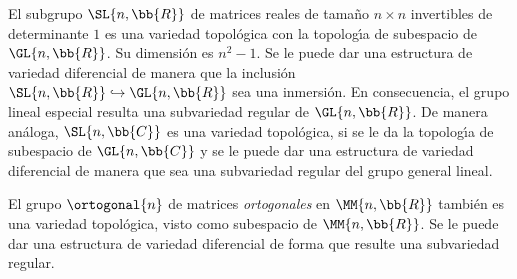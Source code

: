 \begin{ejemplo}
	El subgrupo $\SL{n,\bb{R}}$ de matrices reales de tama\~{n}o
	$n\times n$ invertibles de determinante $1$ es una variedad
	topol\'{o}gica con la topolog\'{\i}a de subespacio de
	$\GL{n,\bb{R}}$. Su dimensi\'{o}n es $n^{2}-1$. Se le puede
	dar una estructura de variedad diferencial de manera que
	la inclusi\'{o}n $\SL{n,\bb{R}}\hookrightarrow\GL{n,\bb{R}}$
	sea una inmersi\'{o}n. En consecuencia, el grupo lineal especial
	resulta una subvariedad regular de $\GL{n,\bb{R}}$.
	De manera an\'{a}loga, $\SL{n,\bb{C}}$ es una variedad topol\'{o}gica,
	si se le da la topolog\'{\i}a de subespacio de $\GL{n,\bb{C}}$ y
	se le puede dar una estructura de variedad diferencial de manera
	que sea una subvariedad regular del grupo general lineal.
\end{ejemplo}

\begin{ejemplo}
	El grupo $\ortogonal{n}$ de matrices \emph{ortogonales} en
	$\MM{n,\bb{R}}$ tambi\'{e}n es una variedad topol\'{o}gica,
	visto como subespacio de $\MM{n,\bb{R}}$. Se le puede dar una
	estructura de variedad diferencial de forma que resulte una
	subvariedad regular.
\end{ejemplo}
